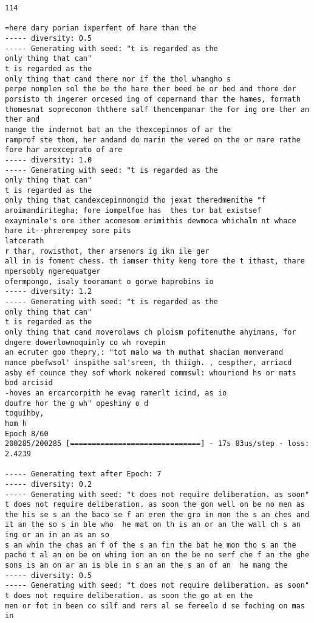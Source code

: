 \documentclass[11pt]{article}
\begin{document}
\begin{Verbatim}[commandchars=\\\{\}]
114

=here dary porian ixperfent of hare than the
----- diversity: 0.5
----- Generating with seed: "t is regarded as the
only thing that can"
t is regarded as the
only thing that cand there nor if the thol whangho s
perpe nomplen sol the be the hare ther beed be or bed and thore der porsisto th ingerer orcesed ing of copernand thar the hames, formath thomesnat soprecomon ththere salf thencempanar the for ing ore ther an ther and
mange the indernot bat an the thexcepinnos of ar the
ramprof ste thom, her andand do marin the vered on the or mare rathe fore har arexceprato of are
----- diversity: 1.0
----- Generating with seed: "t is regarded as the
only thing that can"
t is regarded as the
only thing that candexcepinnongid tho jexat theredmenithe "f aroimandiritegha; fore iompelfoe has  thes tor bat existsef exayninale's ore ither acomesom erimithis dewmoca whichalm nt whace hare it--phrerempey sore pits
latcerath
r thar, rowisthot, ther arsenors ig ikn ile ger
all in is foment chess. th iamser thity keng tore the t ithast, thare mpersobly ngerequatger
ofermpongo, isaly tooramant o gorwe haprobins io 
----- diversity: 1.2
----- Generating with seed: "t is regarded as the
only thing that can"
t is regarded as the
only thing that cand moverolaws ch ploism pofitenuthe ahyimans, for dngere dowerlownoquinly co wh rovepin
an ecruter goo thepry,: "tot malo wa th muthat shacian monverand
mance pbefwsol' inspithe sal'sreen, th thiigh. , cespther, arriacd asby ef counce they sof whork nokered commswl: whouriond hs or mats bod arcisid
-hoves an ercarcorpith he evag ramerlt icind, as io
doufre hor the g wh" opeshiny o d
toquihby,
hom h
Epoch 8/60
200285/200285 [==============================] - 17s 83us/step - loss: 2.4239

----- Generating text after Epoch: 7
----- diversity: 0.2
----- Generating with seed: "t does not require deliberation. as soon"
t does not require deliberation. as soon the gon well on be no men as the his se s an the baco se f an eren the gro in mon the s an ches and it an the so s in ble who  he mat on th is an or an the wall ch s an ing or an in an as an so
s an whin the chas an f of the s an fin the bat he mon tho s an the pacho t al an on be on whing ion an on the be no serf che f an the ghe sons is an on ar an is ble in s an an the s an of an  he mang the 
----- diversity: 0.5
----- Generating with seed: "t does not require deliberation. as soon"
t does not require deliberation. as soon the go at en the
men or fot in been co silf and rers al se fereelo d se foching on mas in


\end{Verbatim}
\end{document}
